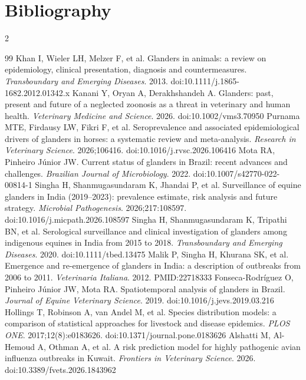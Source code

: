 \documentclass[10pt,openany]{report}
\begin{document}
\chapter*{Bibliography}
\renewcommand{\bibname}{}
\begin{multicols}{2}
\begin{thebibliography}{99}
\footnotesize
\setlength{\itemsep}{0.15em}
\setlength{\parskip}{0pt}
 Khan I, Wieler LH, Melzer F, et al. Glanders in animals: a review on epidemiology, clinical presentation, diagnosis and countermeasures. \emph{Transboundary and Emerging Diseases}. 2013. doi:10.1111/j.1865-1682.2012.01342.x
 Kanani Y, Oryan A, Derakhshandeh A. Glanders: past, present and future of a neglected zoonosis as a threat in veterinary and human health. \emph{Veterinary Medicine and Science}. 2026. doi:10.1002/vms3.70950
 Purnama MTE, Firdausy LW, Fikri F, et al. Seroprevalence and associated epidemiological drivers of glanders in horses: a systematic review and meta-analysis. \emph{Research in Veterinary Science}. 2026;106416. doi:10.1016/j.rvsc.2026.106416
 Mota RA, Pinheiro J\'unior JW. Current status of glanders in Brazil: recent advances and challenges. \emph{Brazilian Journal of Microbiology}. 2022. doi:10.1007/s42770-022-00814-1
 Singha H, Shanmugasundaram K, Jhandai P, et al. Surveillance of equine glanders in India (2019--2023): prevalence estimate, risk analysis and future strategy. \emph{Microbial Pathogenesis}. 2026;217:108597. doi:10.1016/j.micpath.2026.108597
 Singha H, Shanmugasundaram K, Tripathi BN, et al. Serological surveillance and clinical investigation of glanders among indigenous equines in India from 2015 to 2018. \emph{Transboundary and Emerging Diseases}. 2020. doi:10.1111/tbed.13475
 Malik P, Singha H, Khurana SK, et al. Emergence and re-emergence of glanders in India: a description of outbreaks from 2006 to 2011. \emph{Veterinaria Italiana}. 2012. PMID:22718333
 Fonseca-Rodr\'iguez O, Pinheiro J\'unior JW, Mota RA. Spatiotemporal analysis of glanders in Brazil. \emph{Journal of Equine Veterinary Science}. 2019. doi:10.1016/j.jevs.2019.03.216
 Hollings T, Robinson A, van Andel M, et al. Species distribution models: a comparison of statistical approaches for livestock and disease epidemics. \emph{PLOS ONE}. 2017;12(8):e0183626. doi:10.1371/journal.pone.0183626
 Alshatti M, Al-Hemoud A, Othman A, et al. A risk prediction model for highly pathogenic avian influenza outbreaks in Kuwait. \emph{Frontiers in Veterinary Science}. 2026. doi:10.3389/fvets.2026.1843962

\end{thebibliography}
\end{multicols}
\end{document}
